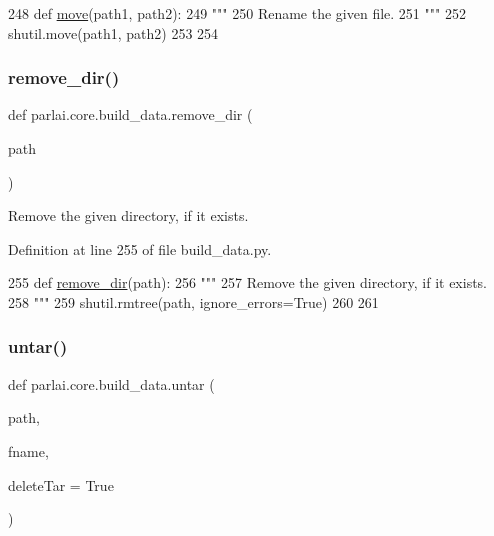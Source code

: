 \begin{DoxyCode}
248 \textcolor{keyword}{def }\hyperlink{namespaceparlai_1_1core_1_1build__data_a1678b8a042eeb9d9c8e9de08f52e496b}{move}(path1, path2):
249     \textcolor{stringliteral}{"""}
250 \textcolor{stringliteral}{    Rename the given file.}
251 \textcolor{stringliteral}{    """}
252     shutil.move(path1, path2)
253 
254 
\end{DoxyCode}
\mbox{\label{namespaceparlai_1_1core_1_1build__data_a24ab3b7e68e41adf774df058d330ff33}} 
\subsubsection{\texorpdfstring{remove\+\_\+dir()}{remove\_dir()}}
{\footnotesize\ttfamily def parlai.\+core.\+build\+\_\+data.\+remove\+\_\+dir (\begin{DoxyParamCaption}\item[{}]{path }\end{DoxyParamCaption})}

\begin{DoxyVerb}Remove the given directory, if it exists.
\end{DoxyVerb}
 

Definition at line 255 of file build\+\_\+data.\+py.


\begin{DoxyCode}
255 \textcolor{keyword}{def }\hyperlink{namespaceparlai_1_1core_1_1build__data_a24ab3b7e68e41adf774df058d330ff33}{remove\_dir}(path):
256     \textcolor{stringliteral}{"""}
257 \textcolor{stringliteral}{    Remove the given directory, if it exists.}
258 \textcolor{stringliteral}{    """}
259     shutil.rmtree(path, ignore\_errors=\textcolor{keyword}{True})
260 
261 
\end{DoxyCode}
\mbox{\label{namespaceparlai_1_1core_1_1build__data_a4d33f97932682a8513904022d852f3cf}} 
\subsubsection{\texorpdfstring{untar()}{untar()}}
{\footnotesize\ttfamily def parlai.\+core.\+build\+\_\+data.\+untar (\begin{DoxyParamCaption}\item[{}]{path,  }\item[{}]{fname,  }\item[{}]{delete\+Tar = {\ttfamily True} }\end{DoxyParamCaption})}

